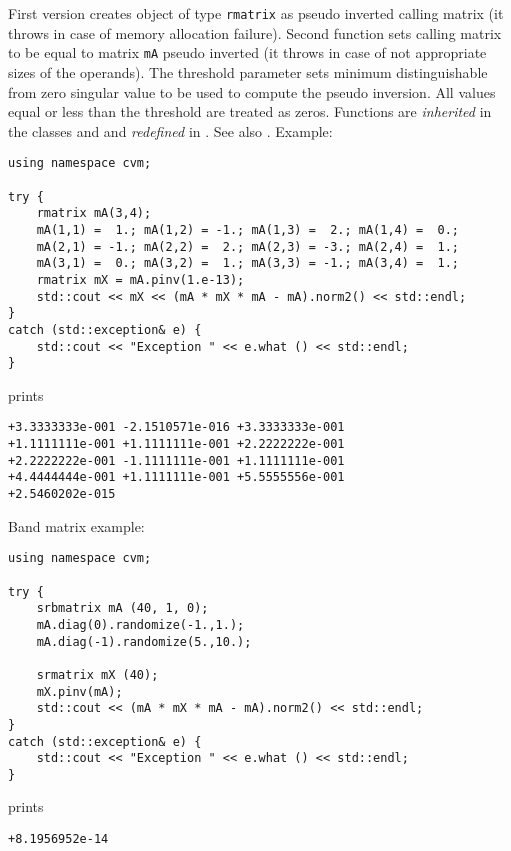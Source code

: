 First version creates  object of type \verb"rmatrix" as
 pseudo inverted calling matrix
(it throws 
in case of memory allocation failure).
Second function sets  calling matrix to be equal to  matrix
\verb"mA" pseudo inverted
(it throws 
in case of not appropriate sizes of the operands).
The threshold parameter sets  minimum distinguishable
from zero singular value to be used to compute the pseudo inversion.
All values equal or less than the threshold are treated as zeros.
Functions are \emph{inherited} in the classes
 and 
and \emph{redefined} in .
See also .
Example:
\begin{Verbatim}
using namespace cvm;

try {
    rmatrix mA(3,4);
    mA(1,1) =  1.; mA(1,2) = -1.; mA(1,3) =  2.; mA(1,4) =  0.;
    mA(2,1) = -1.; mA(2,2) =  2.; mA(2,3) = -3.; mA(2,4) =  1.;
    mA(3,1) =  0.; mA(3,2) =  1.; mA(3,3) = -1.; mA(3,4) =  1.;
    rmatrix mX = mA.pinv(1.e-13);            
    std::cout << mX << (mA * mX * mA - mA).norm2() << std::endl;
}
catch (std::exception& e) {
    std::cout << "Exception " << e.what () << std::endl;
}
\end{Verbatim}
prints
\begin{Verbatim}
+3.3333333e-001 -2.1510571e-016 +3.3333333e-001
+1.1111111e-001 +1.1111111e-001 +2.2222222e-001
+2.2222222e-001 -1.1111111e-001 +1.1111111e-001
+4.4444444e-001 +1.1111111e-001 +5.5555556e-001
+2.5460202e-015
\end{Verbatim}
Band matrix example:
\begin{Verbatim}
using namespace cvm;

try {
    srbmatrix mA (40, 1, 0);
    mA.diag(0).randomize(-1.,1.);
    mA.diag(-1).randomize(5.,10.);

    srmatrix mX (40);
    mX.pinv(mA);
    std::cout << (mA * mX * mA - mA).norm2() << std::endl;
}
catch (std::exception& e) {
    std::cout << "Exception " << e.what () << std::endl;
}
\end{Verbatim}
prints
\begin{Verbatim}
+8.1956952e-14
\end{Verbatim}
\newpage


